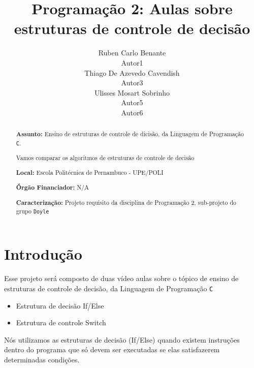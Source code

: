 \documentclass[a4paper,10pt]{article}  %
\title{ Programação 2: }
\title{ Aulas sobre estruturas de controle de decisão}
\author{Ruben Carlo Benante \\ Autor1 \\ Thiago De Azevedo Cavendish \\ Autor3 \\ Ulisses Mosart Sobrinho \\ Autor5 \\ Autor6 }
\begin{document}

\maketitle


\begin{abstract}

\textbf{Assunto:} Ensino de estruturas de controle de dicisão, da Linguagem de Programação \texttt{C}.

Vamos comparar os algoritmos de estruturas de controle de decisão %

\textbf{Local:} Escola Politécnica de Pernambuco - UPE/POLI

\textbf{Órgão Financiador:} N/A

\textbf{Caracterização:} Projeto requisito da disciplina de Programação 2, sub-projeto do grupo \texttt{Doyle}


\end{abstract}




\section{Introdução}


  Esse projeto será composto de duas vídeo aulas sobre o tópico de ensino de estruturas de controle de decisão,  da Linguagem de Programação \texttt{C}

\begin{itemize}

 \item Estrutura de decisão If/Else
 \item Estrutura de controle Switch
\end{itemize}



  Nós utilizamos as estruturas de decisão (If/Else) quando existem instruções
dentro do programa que só devem ser executadas se elas satisfazerem  
determinadas condições.
\end{document}
